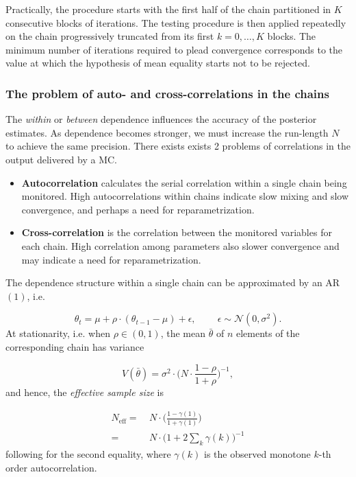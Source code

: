 Practically, the procedure starts with the first half of the chain partitioned in $K$ consecutive blocks of iterations. The testing procedure is then applied repeatedly on the chain progressively truncated from its first $k= 0,\ldots,K$ blocks. The minimum number of iterations required to plead convergence corresponds to the value at which the hypothesis of mean equality starts not to be rejected.





\subsubsection*{The problem of auto- and cross-correlations in the chains}

The \emph{within} or \emph{between} dependence influences the accuracy of the posterior estimates. As dependence becomes stronger, we must increase the run-length $N$ to achieve the same precision. 
There exists exists 2 problems of correlations in the output delivered by a MC. 

\begin{itemize}
	\item \textbf{Autocorrelation} calculates the serial correlation within a single chain being monitored. High autocorrelations within chains indicate slow mixing and slow convergence, and perhaps a need for reparametrization.
	
	\item \textbf{Cross-correlation} is the correlation between the monitored variables for each chain. High correlation among parameters also slower convergence and may indicate a need for reparametrization. 
\end{itemize}
The dependence structure within a single chain can be approximated by an AR$(1)$, i.e. 

\begin{equation*}
\theta_t=\mu + \rho\cdot (\theta_{t-1}-\mu)+\epsilon, \qquad \ \epsilon\sim \mathcal{N}(0,\sigma^2).
\end{equation*}
At stationarity, i.e. when $\rho\in(0,1)$, the mean $\bar{\theta}$ of $n$ elements of the corresponding chain has variance

\begin{equation*} V(\bar{\theta})=\sigma^2\cdot \bigg(N\cdot \frac{1-\rho}{1+\rho}\bigg)^{-1},
\end{equation*}
and hence, the \emph{effective sample size} is 

\begin{equation}\label{eq:neff}
\begin{aligned}
N_{\text{eff}} = & \ N\cdot \bigg( \frac{1-\gamma(1)}{1+\gamma(1)}\bigg) \\
= & \ N\cdot \Big(1+2\sum_k\gamma(k)\Big)^{-1}
\end{aligned}
\end{equation}
following \citet{hartmann_bayesian_2016} for the second equality, where $\gamma(k)$ is the observed monotone $k$-th order autocorrelation.

